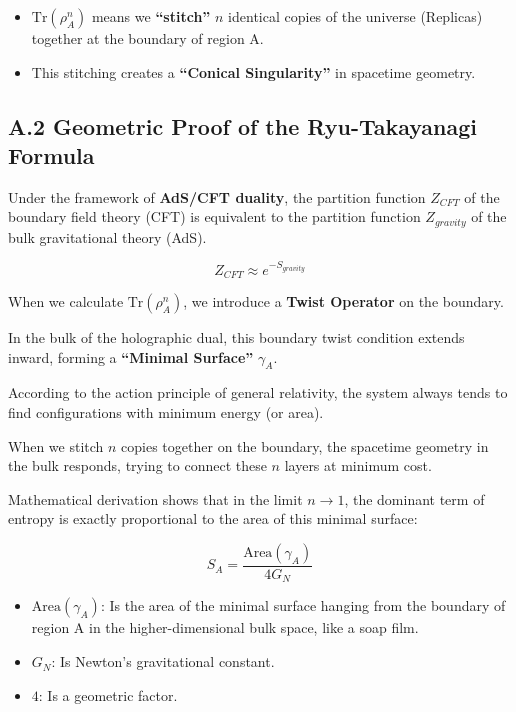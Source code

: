 \begin{itemize}
\item \textbf{$\text{Tr}(\rho_A^n)$} means we \textbf{``stitch''} $n$ identical copies of the universe (Replicas) together at the boundary of region A.

\item This stitching creates a \textbf{``Conical Singularity''} in spacetime geometry.
\end{itemize}

\subsection{A.2 Geometric Proof of the Ryu-Takayanagi Formula}

Under the framework of \textbf{AdS/CFT duality}, the partition function $Z_{CFT}$ of the boundary field theory (CFT) is equivalent to the partition function $Z_{gravity}$ of the bulk gravitational theory (AdS).

\[Z_{CFT} \approx e^{-S_{gravity}}\]

When we calculate $\text{Tr}(\rho_A^n)$, we introduce a \textbf{Twist Operator} on the boundary.

In the bulk of the holographic dual, this boundary twist condition extends inward, forming a \textbf{``Minimal Surface''} $\gamma_A$.

According to the action principle of general relativity, the system always tends to find configurations with minimum energy (or area).

When we stitch $n$ copies together on the boundary, the spacetime geometry in the bulk responds, trying to connect these $n$ layers at minimum cost.

Mathematical derivation shows that in the limit $n \to 1$, the dominant term of entropy is exactly proportional to the area of this minimal surface:

\[S_A = \frac{\text{Area}(\gamma_A)}{4 G_N}\]

\begin{itemize}
\item \textbf{$\text{Area}(\gamma_A)$}: Is the area of the minimal surface hanging from the boundary of region A in the higher-dimensional bulk space, like a soap film.

\item \textbf{$G_N$}: Is Newton's gravitational constant.

\item \textbf{$4$}: Is a geometric factor.
\end{itemize}


